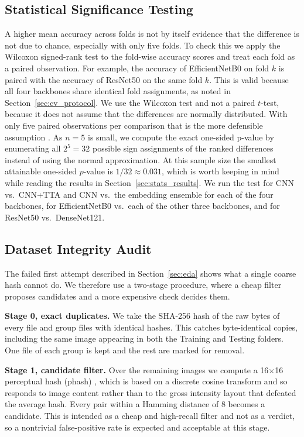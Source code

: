 \documentclass[11pt]{article}
\begin{document}
\subsection{Statistical Significance Testing}
\label{sec:stats_protocol}
A higher mean accuracy across folds is not by itself evidence that the difference is not due to chance, especially with only five folds. To check this we apply the Wilcoxon signed-rank test \cite{wilcoxon1945} to the fold-wise accuracy scores and treat each fold as a paired observation. For example, the accuracy of EfficientNetB0 on fold $k$ is paired with the accuracy of ResNet50 on the same fold $k$. This is valid because all four backbones share identical fold assignments, as noted in Section~\ref{sec:cv_protocol}. We use the Wilcoxon test and not a paired $t$-test, because it does not assume that the differences are normally distributed. With only five paired observations per comparison that is the more defensible assumption \cite{demsar2006statistical}. As $n=5$ is small, we compute the exact one-sided p-value by enumerating all $2^5=32$ possible sign assignments of the ranked differences instead of using the normal approximation. At this sample size the smallest attainable one-sided $p$-value is $1/32 \approx 0.031$, which is worth keeping in mind while reading the results in Section~\ref{sec:stats_results}. We run the test for CNN vs.\ CNN+TTA and CNN vs.\ the embedding ensemble for each of the four backbones, for EfficientNetB0 vs.\ each of the other three backbones, and for ResNet50 vs.\ DenseNet121.



\subsection{Dataset Integrity Audit}
\label{sec:audit_method}
The failed first attempt described in Section~\ref{sec:eda} shows what a single coarse hash cannot do. We therefore use a two-stage procedure, where a cheap filter proposes candidates and a more expensive check decides them.

\textbf{Stage 0, exact duplicates.} We take the SHA-256 hash of the raw bytes of every file and group files with identical hashes. This catches byte-identical copies, including the same image appearing in both the Training and Testing folders. One file of each group is kept and the rest are marked for removal.

\textbf{Stage 1, candidate filter.} Over the remaining images we compute a 16$\times$16 perceptual hash (phash) \cite{zauner2010phash}, which is based on a discrete cosine transform and so responds to image content rather than to the gross intensity layout that defeated the average hash. Every pair within a Hamming distance of 8 becomes a candidate. This is intended as a cheap and high-recall filter and not as a verdict, so a nontrivial false-positive rate is expected and acceptable at this stage.
\end{document}
